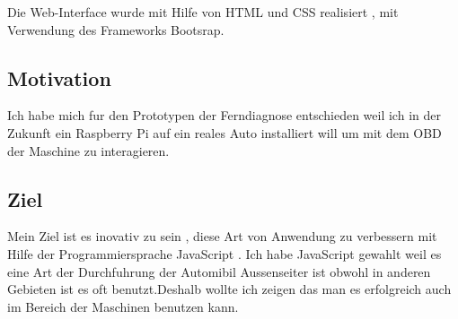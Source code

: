 Die Web-Interface wurde mit Hilfe von HTML und CSS realisiert , mit Verwendung des Frameworks Bootsrap.


\subsection{Motivation}

Ich habe mich fur den Prototypen der Ferndiagnose entschieden weil ich in der Zukunft ein Raspberry Pi auf ein reales Auto installiert will um mit dem OBD der Maschine zu interagieren.


\subsection{Ziel}

Mein Ziel ist es inovativ zu sein , diese Art von Anwendung zu verbessern mit Hilfe der Programmiersprache JavaScript . Ich habe JavaScript gewahlt weil es eine Art der Durchfuhrung der Automibil Aussenseiter ist obwohl in anderen Gebieten ist es oft benutzt.Deshalb wollte ich zeigen das man es erfolgreich auch im Bereich der Maschinen benutzen kann.